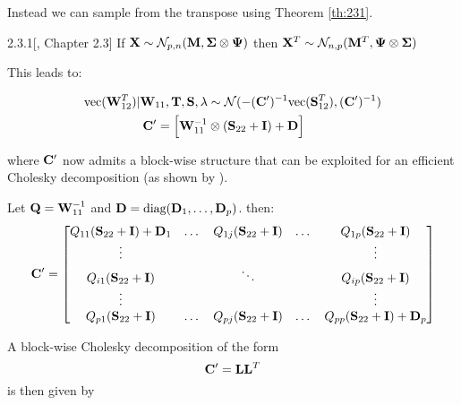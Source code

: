 Instead we can sample from the transpose using Theorem \autoref{th:231}.
\begin{tcolorbox}[colback=yellow!5!white,colframe=yellow!75!black]
	\begin{customthm}{2.3.1}[\cite{gupta2018matrix}, Chapter 2.3]
		\label{th:231}
		If $\mathbf{X} \sim \mathcal{N}_{p,n}(\mathbf{M}, \mathbf{\Sigma} \otimes \mathbf{\Psi})$ then $\mathbf{X}^T \sim \mathcal{N}_{n,p}(\mathbf{M}^T, \mathbf{\Psi} \otimes \mathbf{\Sigma})$
	\end{customthm}
\end{tcolorbox}

This leads to:
\begin{tcolorbox}[colback=red!5!white,colframe=red!60!black]
	\begin{align*}
		\text{vec}(\mathbf{W}_{12}^T) | \mathbf{W}_{11}, \mathbf{T}, \mathbf{S}, \lambda & \sim \mathcal{N}(-(\mathbf{C'})^{-1} \text{vec}(\mathbf{S}_{12}^T), (\mathbf{C'})^{-1}) 
		\\
		\mathbf{C'} = \Big[
		\mathbf{W}_{11}^{-1}                                                       & \otimes (\mathbf{S}_{22} + \mathbf{I})+\mathbf{D}\Big]                                  
	\end{align*}
\end{tcolorbox}
where $\mathbf{C}'$ now admits a block-wise structure that can be exploited for an efficient Cholesky decomposition (as shown by \citet{kaufmann_bayesian_2015}).

Let $\mathbf{Q}=\mathbf{W}_{11}^{-1}$
and $\mathbf{D} = \text{diag}(\mathbf{D}_1,\dots,\mathbf{D}_p)$.
then:
\[
	\mathbf{C}'=
	\begin{bmatrix}
		Q_{11}(\mathbf{S}_{22}+\mathbf{I})+\mathbf{D}_1 & \dots & Q_{1j}(\mathbf{S}_{22}+\mathbf{I}) & \dots & Q_{1p}(\mathbf{S}_{22}+\mathbf{I})              \\
		\vdots                           &       &                       &       & \vdots                             \\
		Q_{i1}(\mathbf{S}_{22}+\mathbf{I})            &       & \ddots                &       & Q_{ip}(\mathbf{S}_{22}+\mathbf{I})              \\
		\vdots                           &       &                       &       & \vdots                             \\
		Q_{p1}(\mathbf{S}_{22}+\mathbf{I})            & \dots & Q_{pj}(\mathbf{S}_{22}+\mathbf{I}) & \dots & Q_{pp}(\mathbf{S}_{22}+\mathbf{I}) + \mathbf{D}_p 
	\end{bmatrix}
\]

A block-wise Cholesky decomposition of the form
$$
\mathbf{C}' = \mathbf{L} \mathbf{L}^T
$$
is then given by

